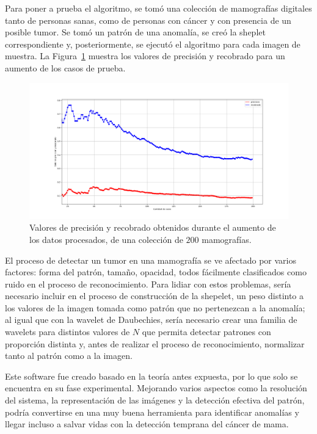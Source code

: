 \par Para poner a prueba el algoritmo, se tom\'o una colecci\'on de mamograf\'ias digitales tanto de personas sanas, como de personas con c\'ancer y con presencia de un posible tumor. Se tom\'o un patr\'on de una anomal\'ia, se cre\'o la sheplet correspondiente y, posteriormente, se ejecut\'o el algoritmo para cada imagen de muestra. La Figura~\ref{prec-rec-2d} muestra los valores de precisi\'on y recobrado para un aumento de los casos de prueba.

\begin{figure}[h]
\center
\includegraphics[scale=.25]{Graphics/PrecRec2D.png}
\caption{Valores de precisi\'on y recobrado obtenidos durante el aumento de los datos procesados, de una colecci\'on de $200$ mamograf\'ias.}
\label{prec-rec-2d}
\end{figure}

\par El proceso de detectar un tumor en una mamograf\'ia se ve afectado por varios factores: forma del patr\'on, tama\~no, opacidad, todos f\'acilmente clasificados como ruido en el proceso de reconocimiento. Para lidiar con estos problemas, ser\'ia necesario incluir en el proceso de construcci\'on de la shepelet, un peso distinto a los valores de la imagen tomada como patr\'on que no pertenezcan a la anomal\'ia; al igual que con la wavelet de Daubechies, ser\'ia necesario crear una familia de wavelets para distintos valores de $N$ que permita detectar patrones con proporci\'on distinta y, antes de realizar el proceso de reconocimiento, normalizar tanto al patr\'on como a la imagen.\\

\par Este software fue creado basado en la teor\'ia antes expuesta, por lo que solo se encuentra en su fase experimental. Mejorando varios aspectos como la resoluci\'on del sistema, la representaci\'on de las im\'agenes y la detecci\'on efectiva del patr\'on, podr\'ia convertirse en una muy buena herramienta para identificar anomal\'ias y llegar incluso a salvar vidas con la detecci\'on temprana del c\'ancer de mama.
